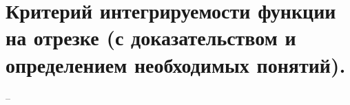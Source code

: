\section{Критерий интегрируемости функции на отрезке (с доказательством и определением необходимых понятий).}
--
\newline